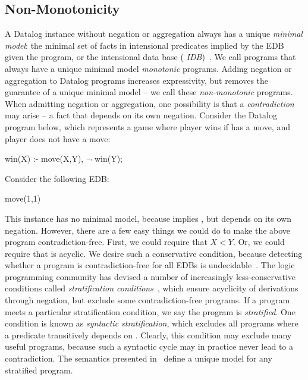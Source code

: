 \subsection{Non-Monotonicity}

A Datalog instance without negation or aggregation always has a unique {\em
minimal model}: the minimal set of facts in intensional predicates implied by
the EDB given the program, or the intensional data base ({\em
IDB})~\cite{ullmanbook}.  We call programs that always have a unique minimal
model {\em monotonic} programs.  Adding negation or aggregation to Datalog
programs increases expressivity, but removes the guarantee of a
unique minimal model -- we call these {\em non-monotonic} programs.  When
admitting negation or aggregation, one possibility is that a {\em
contradiction} may arise -- a fact that depends on its own negation.  Consider
the Datalog program below, which represents a game where player 
wins if has a move, and player  does not have a move:

\begin{Dedalus}
win(X) :- move(X,Y), \(\lnot\) win(Y);
\end{Dedalus}

Consider the following EDB:

\begin{Dedalus}
move(1,1)
\end{Dedalus}

This instance has no minimal model, because  implies
, but  depends on its own negation.  However,
there are a few easy things we could do to make the above program
contradiction-free.  First, we could require that $X < Y$.  Or, we could
require that  is acyclic.  We desire such a conservative
condition, because detecting whether a program is contradiction-free for all
EDBs is undecidable~\cite{papa-yanna}.  The logic programming community has
devised a number of increasingly less-conservative conditions called {\em
stratification conditions}~\cite{local-strat, ross-syntactic, modular,
weak-strat}, which ensure acyclicity of derivations through negation, but
exclude some contradiction-free programs.  If a program meets a particular
stratification condition, we say the program is {\em stratified}.  One
condition is known as {\em syntactic stratification}, which excludes all
programs where a predicate  transitively depends on
.  Clearly, this condition may exclude many useful
programs, because such a syntactic cycle may in practice never lead to a
contradiction.  The semantics presented in~\cite{wellfounded} define a unique
model for any stratified program.

